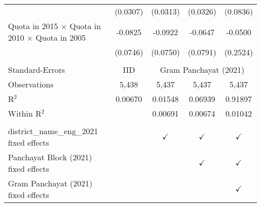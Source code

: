 \begin{tabular}{lcccc}
                                                                 & (0.0307)        & (0.0313)        & (0.0326)        & (0.0836)\\   
   Quota in 2015 $\times$ Quota in 2010 $\times$ Quota in 2005   & -0.0825         & -0.0922         & -0.0647         & -0.0500\\   
                                                                 & (0.0746)        & (0.0750)        & (0.0791)        & (0.2524)\\   
    \\
   Standard-Errors & IID & \multicolumn{3}{c}{Gram Panchayat (2021)} \\ 
   Observations                                                  & 5,438           & 5,437           & 5,437           & 5,437\\  
   R$^2$                                                         & 0.00670         & 0.01548         & 0.06939         & 0.91897\\  
   Within R$^2$                                                  &                 & 0.00691         & 0.00674         & 0.01042\\  
    \\
   district\_name\_eng\_2021 fixed effects                       &                 & $\checkmark$    & $\checkmark$    & $\checkmark$\\   
   Panchayat Block (2021) fixed effects                          &                 &                 & $\checkmark$    & $\checkmark$\\   
   Gram Panchayat (2021) fixed effects                           &                 &                 &                 & $\checkmark$\\   
   \bottomrule
\end{tabular}
\par\endgroup


